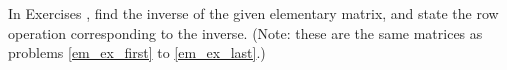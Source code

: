 {\noin In Exercises }
{, find the inverse of the given elementary matrix, and state the row operation corresponding to the inverse. (Note: these are the same matrices as problems \ref{em_ex_first} to \ref{em_ex_last}.)}
